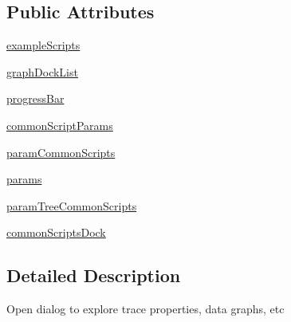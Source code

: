 \subsection*{Public Attributes}
\begin{DoxyCompactItemize}
\item 
\hyperlink{classsoftware_1_1chipwhisperer_1_1analyzer_1_1utils_1_1TraceExplorerDialog_1_1TraceExplorerDialog_ad6d69631ee0d72bfa1ba93544d16864c}{example\+Scripts}
\item 
\hyperlink{classsoftware_1_1chipwhisperer_1_1analyzer_1_1utils_1_1TraceExplorerDialog_1_1TraceExplorerDialog_a78700da0bedecd9bbec11b8b17b30e66}{graph\+Dock\+List}
\item 
\hyperlink{classsoftware_1_1chipwhisperer_1_1analyzer_1_1utils_1_1TraceExplorerDialog_1_1TraceExplorerDialog_a3cf5a03336ad8100cb71978499515bcc}{progress\+Bar}
\item 
\hyperlink{classsoftware_1_1chipwhisperer_1_1analyzer_1_1utils_1_1TraceExplorerDialog_1_1TraceExplorerDialog_a7cd7d4dbefc257024f3c283098cd3719}{common\+Script\+Params}
\item 
\hyperlink{classsoftware_1_1chipwhisperer_1_1analyzer_1_1utils_1_1TraceExplorerDialog_1_1TraceExplorerDialog_a78ac6a0ef5f3da2b23858f995bd33115}{param\+Common\+Scripts}
\item 
\hyperlink{classsoftware_1_1chipwhisperer_1_1analyzer_1_1utils_1_1TraceExplorerDialog_1_1TraceExplorerDialog_a20f13479fb82a81bc675668adbc7438e}{params}
\item 
\hyperlink{classsoftware_1_1chipwhisperer_1_1analyzer_1_1utils_1_1TraceExplorerDialog_1_1TraceExplorerDialog_a4e2a5de8ccc90c212ce348ba063fa473}{param\+Tree\+Common\+Scripts}
\item 
\hyperlink{classsoftware_1_1chipwhisperer_1_1analyzer_1_1utils_1_1TraceExplorerDialog_1_1TraceExplorerDialog_ad7b6e5a91fbfb37d3f5ac8ad033402bf}{common\+Scripts\+Dock}
\end{DoxyCompactItemize}


\subsection{Detailed Description}
\begin{DoxyVerb}Open dialog to explore trace properties, data graphs, etc\end{DoxyVerb}
 

